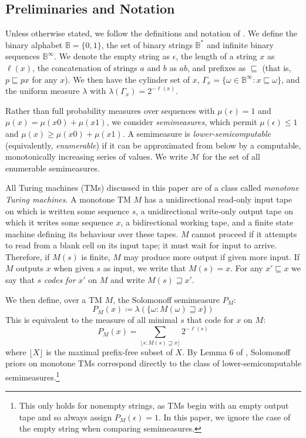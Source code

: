 \documentclass[11pt]{article}
\begin{document}
\subsection{Preliminaries and Notation}
Unless otherwise stated, we follow the definitions and notation of \citet{Wood2013}.
We define the binary alphabet $\mathbb{B}=\{0,1\}$, the set of binary strings $\mathbb{B}^*$ and infinite binary sequences $\mathbb{B}^\infty$. We denote the empty string as $\epsilon$, the length of a string $x$ as $\ell(x)$, the concatenation of strings $a$ and $b$ as $ab$, and prefixes as $\sqsubseteq$ (that is, $p\sqsubseteq px$ for any $x$).
We then have the cylinder set of $x$, $\Gamma_x=\{\omega\in\mathbb{B}^\infty:x\sqsubseteq\omega\}$, and the uniform measure $\lambda$ with $\lambda(\Gamma_x)=2^{-\ell(x)}$.

Rather than full probability measures over sequences with $\mu(\epsilon)=1$ and $\mu(x)=\mu(x0)+\mu(x1)$, we consider \textit{semimeasures}, which permit $\mu(\epsilon)\leq 1$ and $\mu(x)\geq\mu(x0)+\mu(x1)$.
A semimeasure is \textit{lower-semicomputable} (equivalently, \textit{enumerable}) if it can be approximated from below by a computable, monotonically increasing series of values. We write $\mathcal{M}$ for the set of all enumerable semimeasures.

All Turing machines (TMs) discussed in this paper are of a class called \textit{monotone Turing machines}. A monotone TM $M$ has a unidirectional read-only input tape on which is written some sequence $s$, a unidirectional write-only output tape on which it writes some sequence $x$, a bidirectional working tape, and a finite state machine defining its behaviour over these tapes.
$M$ cannot proceed if it attempts to read from a blank cell on its input tape; it must wait for input to arrive. Therefore, if $M(s)$ is finite, $M$ may produce more output if given more input.
If $M$ outputs $x$ when given $s$ as input, we write that $M(s)=x$. For any $x'\sqsubseteq x$ we say that $s$ \textit{codes for} $x'$ on $M$ and write $M(s)\sqsupseteq x'$.

We then define, over a TM $M$, the Solomonoff semimeasure $P_M$:
\[
P_M(x) \coloneq \lambda(\{\omega:M(\omega)\sqsupseteq x\})
\]
This is equivalent to the measure of all minimal $s$ that code for $x$ on $M$:
\[
P_M(x) = \sum_{\lfloor s:M(s)\sqsupseteq x\rfloor} 2^{-\ell(s)}
\]
where $\lfloor X \rfloor$ is the maximal prefix-free subset of $X$.
By Lemma 6 of \citet{Wood2013}, Solomonoff priors on monotone TMs correspond directly to the class of lower-semicomputable semimeasures.\footnote{This only holds for nonempty strings, as TMs begin with an empty output tape and so always assign $P_M(\epsilon)=1$. In this paper, we ignore the case of the empty string when comparing semimeasures.}
\end{document}
